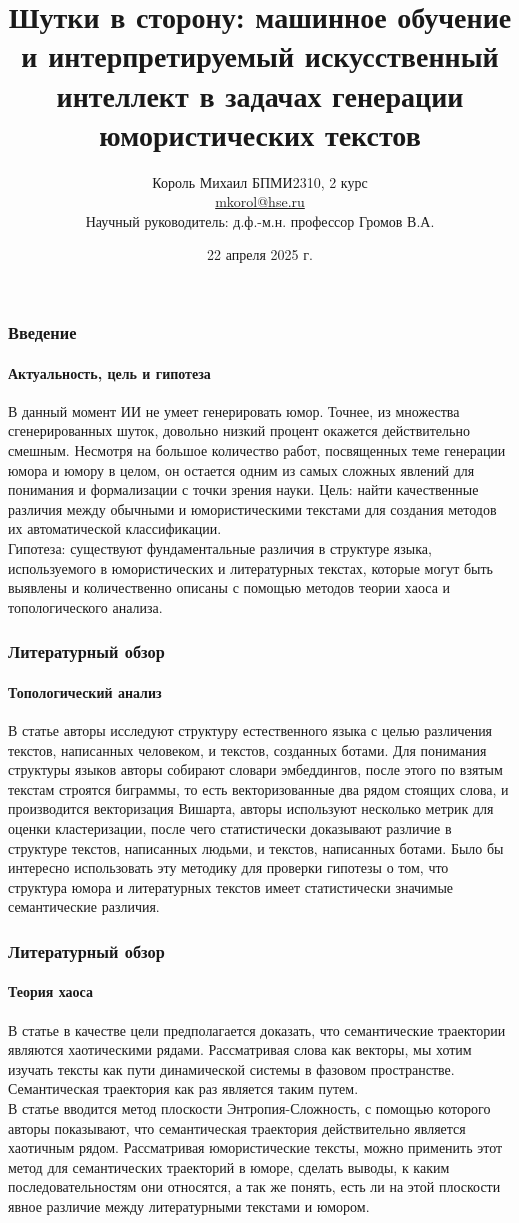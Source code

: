 \documentclass[aspectratio=169]{beamer}
\title[Заголовок]{Шутки в сторону: машинное обучение и интерпретируемый искусственный интеллект в задачах генерации юмористических текстов}
\author[Имя автора]{Король Михаил БПМИ2310, 2 курс \\ \smallskip \scriptsize \url{mkorol@hse.ru} \\{Научный руководитель: д.ф.-м.н. профессор Громов В.А.}}
\institute{Факультет компьютерных наук}
\date{22 апреля 2025 г.}
\begin{document}

\frame[plain]{\titlepage}	%

\begin{frame}
\frametitle{Введение}
\framesubtitle{Актуальность, цель и гипотеза}
	В данный момент ИИ не умеет генерировать юмор. Точнее, из множества сгенерированных шуток, довольно низкий процент окажется действительно смешным. Несмотря на большое количество работ, посвященных теме генерации юмора и юмору в целом, он остается одним из самых сложных явлений для понимания и формализации с точки зрения науки. 
\newline
\newline
	Цель: найти качественные различия между обычными и юмористическими текстами для создания методов их автоматической классификации.\\
	Гипотеза: существуют фундаментальные различия в структуре языка, используемого в юмористических и литературных текстах, которые могут быть выявлены и количественно описаны с помощью методов теории хаоса и топологического анализа.
	
\end{frame}

\begin{frame}
\frametitle{Литературный обзор}
\framesubtitle{Топологический анализ}

В статье \cite{gromov_spot_2024} авторы исследуют структуру естественного языка с целью различения текстов, написанных человеком, и текстов, созданных ботами. Для понимания структуры языков авторы собирают словари эмбеддингов, после этого по взятым текстам строятся биграммы, то есть векторизованные два рядом стоящих слова, и производится векторизация Вишарта, авторы используют несколько метрик для оценки кластеризации, после чего статистически доказывают различие в структуре текстов, написанных людьми, и текстов, написанных ботами. Было бы интересно использовать эту методику для проверки гипотезы о том, что структура юмора и литературных текстов имеет статистически значимые семантические различия.


\end{frame}

\begin{frame}
\frametitle{Литературный обзор}
\framesubtitle{Теория хаоса}

В статье \cite{gromov_semantic_2023} в качестве цели предполагается доказать, что семантические траектории являются хаотическими рядами. Рассматривая слова как векторы, мы хотим изучать тексты как пути динамической системы в фазовом пространстве. Семантическая траектория как раз является таким путем. \\
В статье вводится метод плоскости Энтропия-Сложность, с помощью которого авторы показывают, что семантическая траектория действительно является хаотичным рядом. Рассматривая юмористические тексты, можно применить этот метод для семантических траекторий в юморе, сделать выводы, к каким последовательностям они относятся, а так же понять, есть ли на этой плоскости явное различие между литературными текстами и юмором.

\end{frame}
\end{document}
